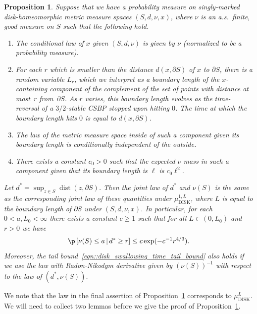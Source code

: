 \documentclass[10pt]{amsart}
\theoremstyle{plain}
\numberwithin{theorem}{section}
\newtheorem{proposition}[theorem]{Proposition}
\theoremstyle{definition}
\DeclareMathOperator{\dist}{dist}
\newcommand{\mudonel}{\mu_{ \mathrm{DISK}}^{1, L}}
\newcommand{\mudl}{\mu_{\mathrm{DISK}}^L}
\newcommand{\giv}{\,|\,}
\begin{document}
\begin{proposition}
\label{prop::disk_area_distance}
Suppose that we have a probability measure on singly-marked disk-homeomorphic metric measure spaces $(S,d,\nu,x)$, where $\nu$ is an a.s.\ finite, good measure on $S$ such that the following hold.
\begin{enumerate}
\item The conditional law of $x$ given $(S,d,\nu)$ is given by $\nu$ (normalized to be a probability measure).
\item For each $r$ which is smaller than the distance $d(x,\partial S)$ of $x$ to $\partial S$, there is a random variable $L_r$, which we interpret as a boundary length of the $x$-containing component of the complement of the set of points with distance at most~$r$ from~$\partial S$. As $r$ varies, this boundary length evolves as the time-reversal of a $3/2$-stable CSBP stopped upon hitting $0$. The time at which the boundary length hits $0$ is equal to $d(x,\partial S)$.
\item The law of the metric measure space inside of such a component given its boundary length is conditionally independent of the outside.
\item There exists a constant $c_0 > 0$ such that the expected $\nu$ mass in such a component given that its boundary length is $\ell$ is $c_0 \ell^2$.
\end{enumerate}
Let $d^* = \sup_{z \in S} \dist(z,\partial S)$. Then the joint law of $d^*$ and $\nu(S)$ is the same as the corresponding joint law of these quantities under $\mudonel$, where $L$ is equal to the boundary length of $\partial S$ under $(S,d,\nu,x)$. In particular, for each $0 < a,L_0 < \infty$ there exists a constant $c \geq 1$ such that for all $L \in (0,L_0)$ and $r > 0$ we have
\begin{equation}
\label{eqn::disk_swallowing_time_tail_bound}
\p\left[\nu(S) \leq a \giv d^* \geq r \right] \leq c\exp(- c^{-1} r^{4/3}).
\end{equation}
Moreover, the tail bound~\eqref{eqn::disk_swallowing_time_tail_bound} also holds if we use the law with Radon-Nikodym derivative given by $(\nu(S))^{-1}$ with respect to the law of $(d^*,\nu(S))$.
\end{proposition}

We note that the law in the final assertion of Proposition~\ref{prop::disk_area_distance} corresponds to $\mudl$. We will need to collect two lemmas before we give the proof of Proposition~\ref{prop::disk_area_distance}.
\end{document}
